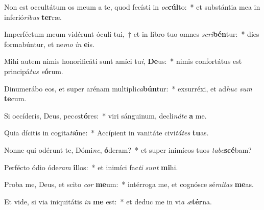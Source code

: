 \item Non est occultátum os meum a te, quod fecísti in \textit{oc}\textbf{cúl}to:~* et substántia mea in inferió\textit{ri}\textit{bus} \textbf{ter}ræ.
\item Imperféctum meum vidérunt óculi tui,~† et in libro tuo omnes \textit{scri}\textbf{bén}tur:~* dies formabúntur, et ne\textit{mo} \textit{in} \textbf{e}is.
\item Mihi autem nimis honorificáti sunt amíci tu\textit{i}, \textbf{De}us:~* nimis confortátus est principá\textit{tus} \textit{e}\textbf{ó}rum.
\item Dinumerábo eos, et super arénam multipli\textit{ca}\textbf{bún}tur:~* exsurréxi, et ad\textit{huc} \textit{sum} \textbf{te}cum.
\item Si occíderis, Deus, pec\textit{ca}\textbf{tó}res:~* viri sánguinum, decli\textit{ná}\textit{te} \textbf{a} me.
\item Quia dícitis in cogita\textit{ti}\textbf{ó}ne:~* Accípient in vanitáte civi\textit{tá}\textit{tes} \textbf{tu}as.
\item Nonne qui odérunt te, Dómi\textit{ne}, \textbf{ó}deram?~* et super inimícos tuos \textit{ta}\textit{be}\textbf{scé}bam?
\item Perfécto ódio óde\textit{ram} \textbf{il}los:~* et inimíci fac\textit{ti} \textit{sunt} \textbf{mi}hi.
\item Proba me, Deus, et scito \textit{cor} \textbf{me}um:~* intérroga me, et cognósce sé\textit{mi}\textit{tas} \textbf{me}as.
\item Et vide, si via iniquitátis \textit{in} \textbf{me} est:~* et deduc me in vi\textit{a} \textit{æ}\textbf{tér}na.
